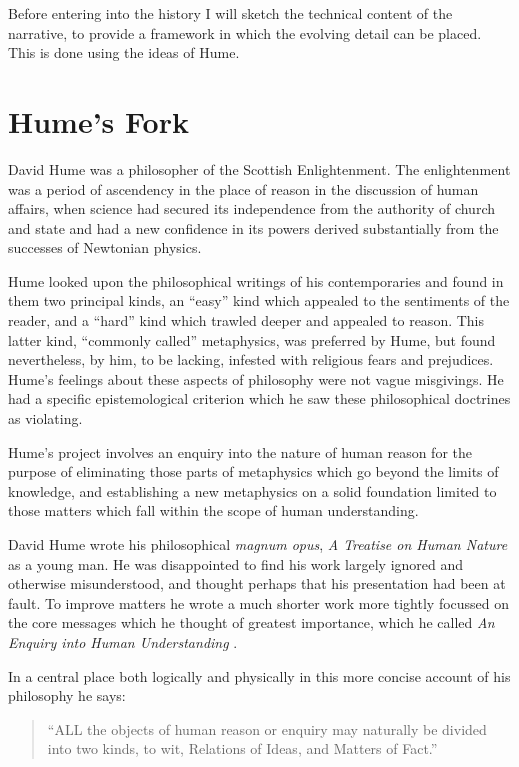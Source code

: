Before entering into the history I will sketch the technical content
of the narrative, to provide a framework in which the evolving detail
can be placed.
This is done using the ideas of Hume.

\section{Hume's Fork}\label{HumesFork}

David Hume was a philosopher of the Scottish Enlightenment.
The enlightenment was a period of ascendency in the place of reason in
the discussion of human affairs, when science had secured its
independence from the authority of church and state and had a new
confidence in its powers derived substantially from the successes of
Newtonian physics.

Hume looked upon the philosophical writings of his contemporaries and
found in them two principal kinds, an ``easy'' kind which appealed to
the sentiments of the reader, and a ``hard'' kind which trawled deeper
and appealed to reason.
This latter kind, ``commonly called'' metaphysics, was preferred by
Hume, but found nevertheless, by him, to be lacking, infested with religious 
fears and prejudices.
Hume's feelings about these aspects of philosophy were not vague
misgivings.
He had a specific epistemological criterion which he saw these
philosophical doctrines as violating.

Hume's project involves an enquiry into the nature of human reason for
the purpose of eliminating those parts of metaphysics which go beyond
the limits of knowledge, and establishing a new metaphysics on a
solid foundation limited to those matters which fall within the scope
of human understanding.

David Hume wrote his philosophical \emph{magnum opus}, \emph{A Treatise on
  Human Nature} \cite{humeTHN} as a young man.
He was disappointed to find his work largely ignored and otherwise
misunderstood, and thought perhaps that his presentation had been at
fault.
To improve matters he wrote a much shorter work more tightly focussed
on the core messages which he thought of greatest importance, which he
called \emph{An Enquiry into Human Understanding}
\cite{humeECHU}.

In a central place both logically and physically in this more concise
account of his philosophy he says:

\begin{quote}
``ALL the objects of human reason or enquiry may naturally be divided
  into two kinds, to wit, Relations of Ideas, and Matters of Fact.'' 
\end{quote}

